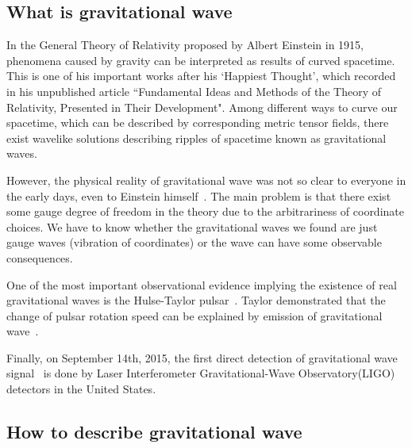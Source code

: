 \subsection{What is gravitational wave}

In the General Theory of Relativity proposed by Albert Einstein in 1915, phenomena caused by gravity can be interpreted as results of curved spacetime. This is one of his important works after his `Happiest Thought', which recorded in his unpublished article ``Fundamental Ideas and Methods of the Theory of Relativity, Presented in Their Development"\cite{Einstein:happy}. Among different ways to curve our spacetime, which can be described by corresponding metric tensor fields, there exist wavelike solutions describing ripples of spacetime known as gravitational waves.

However, the physical reality of gravitational wave was not so clear to everyone in the early days, even to Einstein himself~\cite{Einstein:prl, Einstein:ongw}. The main problem is that there exist some gauge degree of freedom in the theory due to the arbitrariness of coordinate choices. We have to know whether the gravitational waves we found are just gauge waves (vibration of coordinates) or the wave can have some observable consequences. 

One of the most important observational evidence implying the existence of real gravitational waves is the Hulse-Taylor pulsar~\cite{HulseTaylor:discovery}. Taylor demonstrated that the change of pulsar rotation speed can be explained by emission of gravitational wave~\cite{HulseTaylor:gr, HulseTaylor:gr2}.  

Finally, on September 14th, 2015, the first direct detection of gravitational wave signal~\cite{gw:150914_det} is done by Laser Interferometer Gravitational-Wave Observatory(LIGO) detectors in the United States.

\subsection{How to describe gravitational wave}

